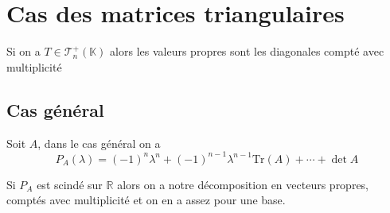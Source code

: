 \documentclass[11pt,colorlinks]{book}
\theoremstyle{mytheoremstyle}
\theoremstyle{mytheoremstyle}
\theoremstyle{mytheoremstyle}
\theoremstyle{mytheoremstyle}
\theoremstyle{mytheoremstyle}
\theoremstyle{mytheoremstyle}
\theoremstyle{mytheoremstyle}
\theoremstyle{mytheoremstyle}
\theoremstyle{myproblemstyle}
\def\mbb#1{\mathbb{#1}}
\def\mfc#1{\mathcal{#1}}
\def\bR{\mbb{R}}
\def\bK{\mbb{K}}
\begin{document}
\section{Cas des matrices triangulaires}
\begin{definition}
  Si on a $T \in \mfc{T}^+_n(\bK)$ alors les valeurs propres sont les diagonales compté avec multiplicité 
\end{definition}
\subsection{Cas général}
\begin{definition}
  Soit $A$, dans le cas général on a 
  \begin{equation*}
    P_A(\lambda) = (-1)^n \lambda^n + (-1)^{n-1} \lambda^{n-1} \text{Tr}(A) + \cdots + \det A
  \end{equation*}
\end{definition}
\begin{rmq}
  Si $P_A$ est scindé sur $\bR$ alors on a notre décomposition en vecteurs propres, comptés avec multiplicité et on en a assez pour une base.
\end{rmq}
\end{document}

